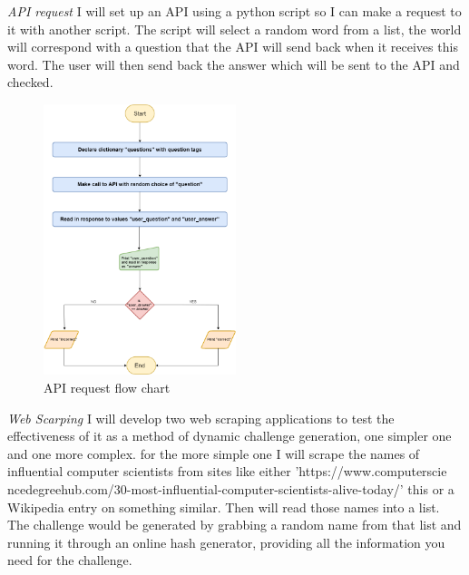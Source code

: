 \documentclass[12pt,a4paper]{article}
\begin{document}
\emph{API request} 
I will set up an API using a python script so I can make a request to it with another script. The script will select a random word from a list, the world will correspond with a question that the API will send back when it receives this word. The user will then send back the answer which will be sent to the API and checked.   

\begin{figure}[h]
    \centering
    \includegraphics[width=0.5\textwidth]{API_request.png} 
    \caption{API request flow chart}
\end{figure}   


\emph{Web Scarping} 
I will develop two web scraping applications to test the effectiveness of it as a method of dynamic challenge generation, one simpler one and one more complex. for the more simple one I will scrape the names of influential computer scientists from sites like either 'https://www.computerscie
ncedegreehub.com/30-most-influential-computer-scientists-alive-today/' this or a Wikipedia entry on something similar. Then will read those names into a list. The challenge would be generated by grabbing a random name from that list and running it through an online hash generator, providing all the information you need for the challenge.   
\end{document}
